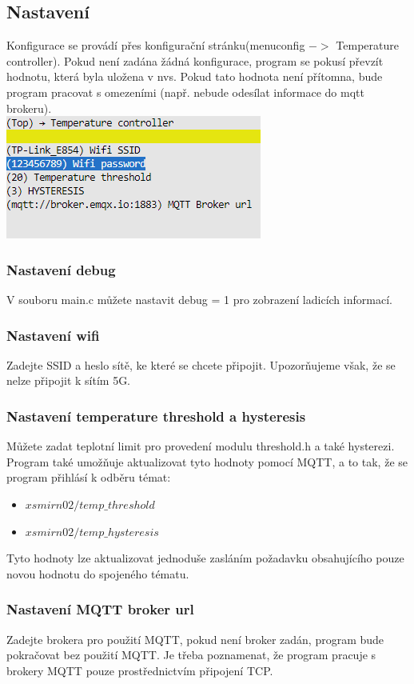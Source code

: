 \documentclass[12pt]{article}
\begin{document}
\subsection{Nastavení}
Konfigurace se provádí přes  konfigurační stránku(menuconfig $->$ Temperature controller). Pokud není zadána žádná konfigurace, program se pokusí převzít hodnotu, která byla uložena v nvs. Pokud tato hodnota není přítomna, bude program pracovat s omezeními (např. nebude odesílat informace do mqtt brokeru).\\
{\includegraphics[width=0.7\linewidth]{menuconfig.png}}\\[50pt]

\subsubsection{Nastavení debug}
V souboru main.c můžete nastavit debug = 1 pro zobrazení ladicích informací.

\subsubsection{Nastavení wifi}
Zadejte SSID a heslo sítě, ke které se chcete připojit. Upozorňujeme však, že se nelze připojit k sítím 5G.

\subsubsection{Nastavení temperature threshold a hysteresis}
Můžete zadat teplotní limit pro provedení modulu threshold.h a také hysterezi.
Program také umožňuje aktualizovat tyto hodnoty pomocí MQTT, a to tak, že se program přihlásí k odběru témat:
\begin{itemize}
    \item $xsmirn02/temp\_threshold$ 
    \item $xsmirn02/temp\_hysteresis$ 
\end{itemize}
Tyto hodnoty lze aktualizovat jednoduše zasláním požadavku obsahujícího pouze novou hodnotu do spojeného tématu.

\subsubsection{Nastavení MQTT broker url}
Zadejte brokera pro použití MQTT, pokud není broker zadán, program bude pokračovat bez použití MQTT. Je třeba poznamenat, že program pracuje s brokery MQTT pouze prostřednictvím připojení TCP.


% 
% 
\end{document}

